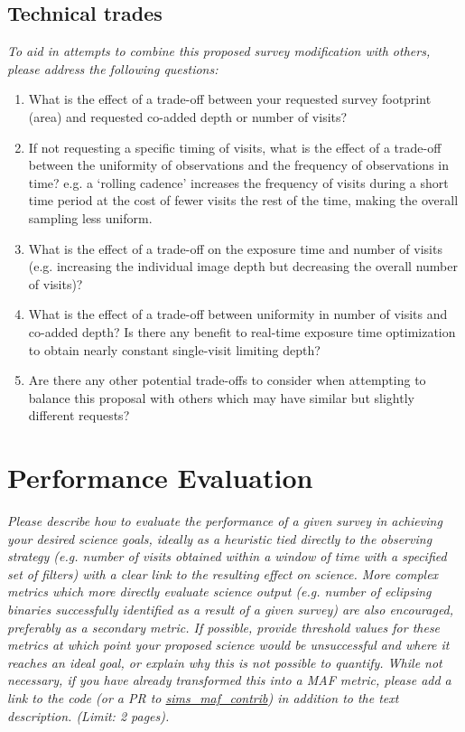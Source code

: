\documentclass[11pt]{article}
\begin{document}
\subsection{Technical trades}
\begin{footnotesize}
{\it To aid in attempts to combine this proposed survey modification with others, please address the following questions:
\begin{enumerate}
    \item What is the effect of a trade-off between your requested survey footprint (area) and requested co-added depth or number of visits?
    \item If not requesting a specific timing of visits, what is the effect of a trade-off between the uniformity of observations and the frequency of observations in time? e.g. a `rolling cadence' increases the frequency of visits during a short time period at the cost of fewer visits the rest of the time, making the overall sampling less uniform.
    \item What is the effect of a trade-off on the exposure time and number of visits (e.g. increasing the individual image depth but decreasing the overall number of visits)?
    \item What is the effect of a trade-off between uniformity in number of visits and co-added depth? Is there any benefit to real-time exposure time optimization to obtain nearly constant single-visit limiting depth?
    \item Are there any other potential trade-offs to consider when attempting to balance this proposal with others which may have similar but slightly different requests?
\end{enumerate}}
\end{footnotesize}

\section{Performance Evaluation}
\begin{footnotesize}
{\it Please describe how to evaluate the performance of a given survey in achieving your desired
science goals, ideally as a heuristic tied directly to the observing strategy (e.g. number of visits obtained
within a window of time with a specified set of filters) with a clear link to the resulting effect on science.
More complex metrics which more directly evaluate science output (e.g. number of eclipsing binaries successfully
identified as a result of a given survey) are also encouraged, preferably as a secondary metric.
If possible, provide threshold values for these metrics at which point your proposed science would be unsuccessful 
and where it reaches an ideal goal, or explain why this is not possible to quantify. While not necessary, 
if you have already transformed this into a MAF metric, please add a link to the code (or a PR to 
\href{https://github.com/lsst-nonproject/sims_maf_contrib}{sims\_maf\_contrib}) in addition to the text description. (Limit: 2 pages).}
\end{footnotesize}
\end{document}
